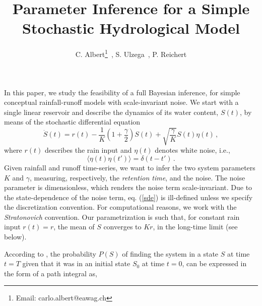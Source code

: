 \documentclass[11pt, a4paper]{article}
\begin{document}
\title{Parameter Inference for a Simple Stochastic Hydrological Model}

\author{C. Albert\thanks{\noindent Email: carlo.albert@eawag.ch} \,,
S. Ulzega \,, P. Reichert}
\maketitle

In this paper, we study the feasibility of a full Bayesian inference, for simple conceptual rainfall-runoff models with scale-invariant noise.
We start with a single linear reservoir and describe the dynamics of its water content, $S(t)$, by means of the stochastic differential equation
\begin{equation}\label{sde}
\dot{S}(t) = r(t) - \frac{1}{K}\left(1+\frac{\gamma}{2}\right) S(t)
+
\sqrt{\frac{\gamma}{K}} S(t){\eta}(t)\,,
\end{equation}
where $r(t)$ describes the rain input and $\eta(t)$ denotes white noise, i.e.,
\begin{equation}\label{whitenoise}
\langle\eta(t)\eta(t')\rangle = \delta(t-t')\,.
\end{equation}
Given rainfall and runoff time-series, we want to infer the two system parameters $K$ and $\gamma$, measuring, respectively, the {\em retention time}, and the noise.
The noise parameter is dimensionless, which renders the noise term scale-invariant.
Due to the state-dependence of the noise term, eq. (\ref{sde}) is ill-defined unless we specify the discretization convention.
For computational reasons, we work with the {\em Stratonovich} convention.
Our parametrization is such that, for constant rain input $r(t)=r$, the mean of $S$ converges to $Kr$, in the long-time limit (see below).

According to \cite{lau_2007_StateDepDiff}, the probability $P(S)$ of finding the system in a state $S$ at time $t = T$ given that it was in an initial state $S_0$ at time $t = 0$, can be expressed in the form of a path integral as,
\end{document}
